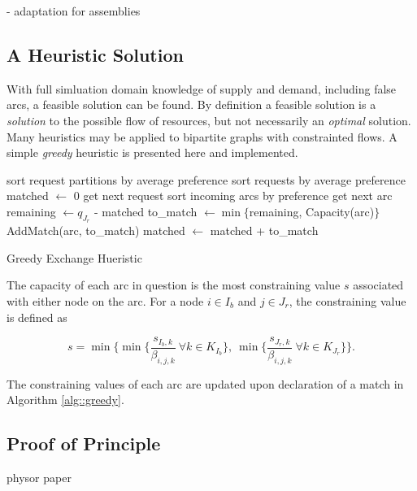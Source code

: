 - adaptation for assemblies

\subsection{A Heuristic Solution}

With full simluation domain knowledge of supply and demand, including false
arcs, a feasible solution can be found. By definition a feasible solution is a
\textit{solution} to the possible flow of resources, but not necessarily an
\textit{optimal} solution. Many heuristics may be applied to bipartite graphs
with constrainted flows. A simple \textit{greedy} heuristic is presented here
and implemented. 

\begin{algorithm}[h!]
 \SetAlgoLined
 sort request partitions by average preference\;
  {
   sort requests by average preference\;
   matched $\leftarrow$ 0\;        
    {
     get next request\;
     sort incoming arcs by preference\;
      {
       get next arc\;
       remaining $\leftarrow q_{J_r}$ - matched\;
       to\_match $\leftarrow \min \lbrace$remaining, Capacity(arc)$\rbrace$\;
       AddMatch(arc, to\_match)\;
       matched $\leftarrow$ matched + to\_match\;
     }
   }
 }
 \caption{Greedy Exchange Hueristic}\label{alg::greedy}
\end{algorithm}

The capacity of each arc in question is the most constraining value $s$
associated with either node on the arc. For a node $i \in I_b$ and $j \in J_r$,
the constraining value is defined as

\begin{equation}
  s = \min 
        \lbrace 
        \min \lbrace \frac{s_{I_b, k}}{\beta_{i, j, k}} 
        \: \forall k \in K_{I_b} \rbrace, 
        \: \min \lbrace \frac{s_{J_r, k}}{\beta_{i, j, k}} 
        \: \forall k \in K_{J_r} \rbrace
        \rbrace.
\end{equation}

The constraining values of each arc are updated upon declaration of a match in
Algorithm \ref{alg::greedy}.

\subsection{Proof of Principle}

physor paper
